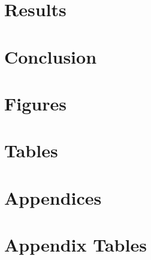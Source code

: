 \documentclass{article}[11pt,subeqn]
\newcommand{\twinfolder}{./../../../Twins}
\begin{document}
\begin{spacing}{1.4}
\section{Results}


\section{Conclusion}





\newpage
\section*{Figures}


\clearpage

\section*{Tables}

\clearpage
\newpage



\newpage
\appendix
\section*{Appendices}

\section{Appendix Tables}



\end{spacing}
\end{document}
